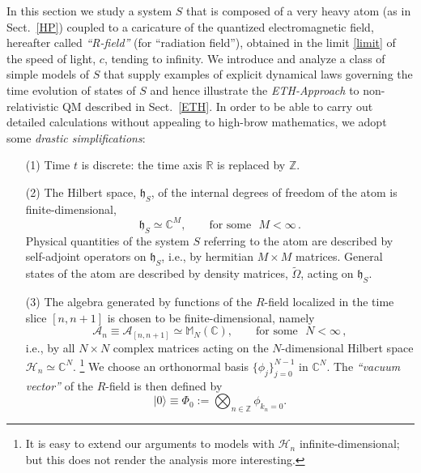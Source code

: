 \documentclass[12pt]{article}
\begin{document}
In this section we study a system $S$ that is composed of a very heavy atom (as in Sect.~\ref{HP}) coupled to a 
caricature of the quantized electromagnetic field, hereafter called \textit{``R-field''} (for ``radiation field''), obtained 
in the limit \eqref{limit} of the speed of light, $c$, tending to infinity. We introduce and analyze a class of simple 
models of $S$ that supply examples of explicit dynamical laws governing the time evolution of states of $S$ and 
hence illustrate the \textit{\textit{ETH}-Approach} to non-relativistic QM described in Sect.~\ref{ETH}. In order to be able 
to carry out detailed calculations without appealing to high-brow mathematics, we adopt some \textit{drastic simplifications}:
\begin{enumerate}
\item[(1)]{Time $t$ is discrete: the time axis $\mathbb{R}$ is replaced by $\mathbb{Z}$.}
\item[(2)]{ The Hilbert space, $\mathfrak{h}_S$, of the internal degrees of freedom of the atom is finite-dimensional,
\begin{equation}\label{atom}
\mathfrak{h}_S \simeq \mathbb{C}^{M}, \qquad \text{for some }\,\, M<\infty\,.
\end{equation}
Physical quantities of the system $S$ referring to the atom are described by self-adjoint operators on $\mathfrak{h}_S$, 
i.e., by hermitian $M\times M$ matrices. General states of the atom are described by density matrices, $\widetilde{\Omega}$, 
acting on $\mathfrak{h}_S$.} 
\item[(3)]{The algebra generated by functions of the $R$-field localized in the time slice $[n,n+1]$ is chosen to be finite-dimensional, namely
\begin{equation}\label{algebra at fixed time}
\mathcal{A}_{n}\equiv \mathcal{A}_{[n,n+1]} \simeq \mathbb{M}_{N}(\mathbb{C}), \qquad \text{for some  }\,\, N<\infty\,,
\end{equation}
i.e., by all $N\times N$ complex matrices acting on the $N$-dimensional Hilbert space \mbox{$\mathcal{H}_n \simeq 
\mathbb{C}^{N}$.} \footnote{It is easy to extend our arguments to models with $\mathcal{H}_n$ 
infinite-dimensional; but this does not render the analysis more interesting.} We choose an orthonormal basis 
$\big\{\phi_j\big\}_{j=0}^{N-1}$ in $\mathbb{C}^{N}$. The \textit{``vacuum vector''} of the $R$-field is then defined by
\begin{equation}\label{vacuum}
\vert 0 \rangle \equiv \Phi_{{0}}:= \bigotimes_{n\in \mathbb{Z}} \phi_{k_n =0}.
\end{equation} 
}
\end{enumerate}
\end{document}
